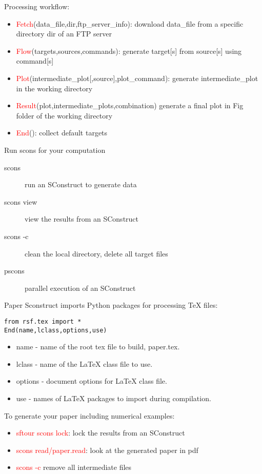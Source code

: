   Processing workflow:
  \begin{itemize}
    \item \textcolor{red}{Fetch}(data\_file,dir,ftp\_server\_info): download data\_file from a specific directory dir of an FTP server
    \item \textcolor{red}{Flow}(targets,sources,commands): generate target[s]  from source[s] using command[s]
    \item \textcolor{red}{Plot}(intermediate\_plot[,source],plot\_command): generate intermediate\_plot in the working directory
    \item \textcolor{red}{Result}(plot,intermediate\_plots,combination) generate a final plot  in Fig folder of the working directory
    \item \textcolor{red}{End}(): collect default targets 
  \end{itemize}
  \vspace{1em}
  Run scons for your computation
  \begin{description}
    \item[scons] 	run an SConstruct to generate data
    \item[scons view] 	view the results from an SConstruct
    \item[scons -c] 	clean the local directory, delete all target files
    \item[pscons] 	parallel execution of an SConstruct 
  \end{description}


Paper Sconstruct imports Python packages for processing TeX files:
\begin{verbatim}
from rsf.tex import * 
End(name,lclass,options,use)
\end{verbatim}
  \begin{itemize}
    \item name - name of the root tex file to build, paper.tex.
    \item lclass - name of the LaTeX class file to use.
    \item options - document options for LaTeX class file.
    \item use - names of LaTeX packages to import during compilation.
  \end{itemize}
To generate your paper including numerical examples:
 \begin{itemize}
  \item \textcolor{red}{sftour scons lock}: lock the results from an SConstruct
  \item \textcolor{red}{scons read/paper.read}:	look at the generated paper in pdf
  \item \textcolor{red}{scons -c} 	remove all intermediate files
 \end{itemize}
 
